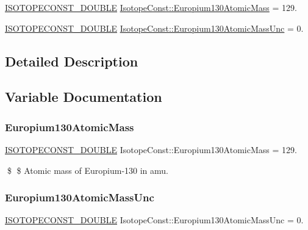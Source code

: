 \begin{DoxyCompactItemize}
\item 
\mbox{\hyperlink{group___isotope_const-_macros_ga8f45a7272ce02c0b4c65c44636ed719a}{I\+S\+O\+T\+O\+P\+E\+C\+O\+N\+S\+T\+\_\+\+D\+O\+U\+B\+LE}} \mbox{\hyperlink{group___isotope_const-_europium-_eu130_ga46c085656d62b9edc2dee830780f8461}{Isotope\+Const\+::\+Europium130\+Atomic\+Mass}} = 129.
\item 
\mbox{\hyperlink{group___isotope_const-_macros_ga8f45a7272ce02c0b4c65c44636ed719a}{I\+S\+O\+T\+O\+P\+E\+C\+O\+N\+S\+T\+\_\+\+D\+O\+U\+B\+LE}} \mbox{\hyperlink{group___isotope_const-_europium-_eu130_gad6073375d701d66a55fce16c44e5a380}{Isotope\+Const\+::\+Europium130\+Atomic\+Mass\+Unc}} = 0.
\end{DoxyCompactItemize}


\subsection{Detailed Description}


\subsection{Variable Documentation}
\mbox{\label{group___isotope_const-_europium-_eu130_ga46c085656d62b9edc2dee830780f8461}} 
\subsubsection{\texorpdfstring{Europium130\+Atomic\+Mass}{Europium130AtomicMass}}
{\footnotesize\ttfamily \mbox{\hyperlink{group___isotope_const-_macros_ga8f45a7272ce02c0b4c65c44636ed719a}{I\+S\+O\+T\+O\+P\+E\+C\+O\+N\+S\+T\+\_\+\+D\+O\+U\+B\+LE}} Isotope\+Const\+::\+Europium130\+Atomic\+Mass = 129.}

\$ \$ Atomic mass of Europium-\/130 in amu. \mbox{\label{group___isotope_const-_europium-_eu130_gad6073375d701d66a55fce16c44e5a380}} 
\subsubsection{\texorpdfstring{Europium130\+Atomic\+Mass\+Unc}{Europium130AtomicMassUnc}}
{\footnotesize\ttfamily \mbox{\hyperlink{group___isotope_const-_macros_ga8f45a7272ce02c0b4c65c44636ed719a}{I\+S\+O\+T\+O\+P\+E\+C\+O\+N\+S\+T\+\_\+\+D\+O\+U\+B\+LE}} Isotope\+Const\+::\+Europium130\+Atomic\+Mass\+Unc = 0.}


